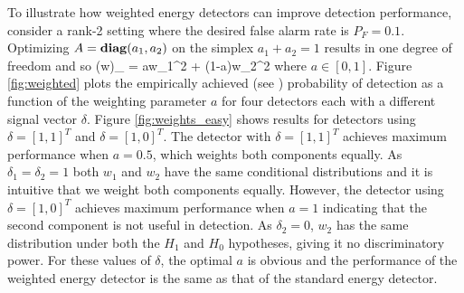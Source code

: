 To illustrate how weighted energy detectors can improve detection performance, consider a rank-2 setting where the desired
false alarm rate is $P_F=0.1$. Optimizing $A=\mathop{\bf diag}(a_1,a_2)$ on the simplex $a_1+a_2=1$
results in one degree of freedom and so
\be
\Lambda(w)_{} = aw_1^2 + (1-a)w_2^2  
\ee
where $a\in[0,1]$. Figure \ref{fig:weighted} plots the empirically achieved (see
\cite{fawcett2006introduction}) probability of detection as a 
function of the weighting parameter $a$ for four detectors each with a different signal
vector $\delta$. Figure \ref{fig:weights_easy} shows results for detectors using
$\delta=[1,1]^T$ and $\delta=[1,0]^T$. The detector with $\delta=[1, 1]^T$ achieves
maximum performance when $a=0.5$, which weights both components equally. As
$\delta_1=\delta_2=1$ both $w_1$ and $w_2$ have the same conditional distributions and it
is intuitive that we weight both components equally. However, the detector using
$\delta=[1, 0]^T$ achieves maximum performance when $a=1$ indicating that the second
component is not useful in detection. As $\delta_2=0$, $w_2$ has the same distribution
under both the $H_1$ and $H_0$ hypotheses, giving it no discriminatory power. For these
values of $\delta$, the optimal $a$ is obvious and the performance of the weighted energy
detector is the same as that of the standard energy detector.

